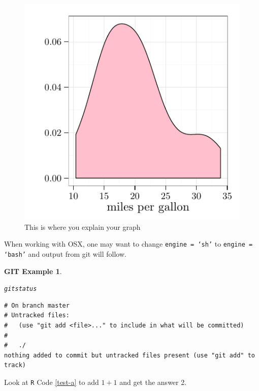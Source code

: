 \documentclass{article}\usepackage[]{graphicx}\usepackage[]{color}
\makeatletter
\def\maxwidth{ %
  \ifdim\Gin@nat@width>\linewidth
    \linewidth
  \else
    \Gin@nat@width
  \fi
}
\newenvironment{kframe}{%
 \def\at@end@of@kframe{}%
 \ifinner\ifhmode%
  \def\at@end@of@kframe{\end{minipage}}%
  \begin{minipage}{\columnwidth}%
 \fi\fi%
 \def\FrameCommand##1{\hskip\@totalleftmargin \hskip-\fboxsep
 \colorbox{shadecolor}{##1}\hskip-\fboxsep
     \hskip-\linewidth \hskip-\@totalleftmargin \hskip\columnwidth}%
 \MakeFramed {\advance\hsize-\width
   \@totalleftmargin\z@ \linewidth\hsize
   \@setminipage}}%
 {\par\unskip\endMakeFramed%
 \at@end@of@kframe}
\newenvironment{knitrout}{}{} %
\newtheorem{GIT}{GIT Example}[section]
\makeatother
\begin{document}
\begin{figure}[h]
\begin{knitrout}
\color{fgcolor}

{\centering \includegraphics[width=\maxwidth]{figure/GraphShow} 

}



\end{knitrout}

\caption{This is where you explain your graph \label{graphDude}}
\end{figure}

When working with OSX, one may want to change \texttt{engine = `sh'} to \texttt{engine = `bash'} 
and output from git will follow.

\begin{knitrout}
\color{fgcolor}\begin{kframe}
\begin{GIT}\label{GIT}\hfill{}\begin{alltt}
git status
\end{alltt}

\begin{verbatim}
# On branch master
# Untracked files:
#   (use "git add <file>..." to include in what will be committed)
#
#	./
nothing added to commit but untracked files present (use "git add" to track)
\end{verbatim}
\end{GIT}\end{kframe}
\end{knitrout}


Look at \texttt{R} Code \ref{test-a} to add $1 + 1$ and get the answer 2.
\end{document}

